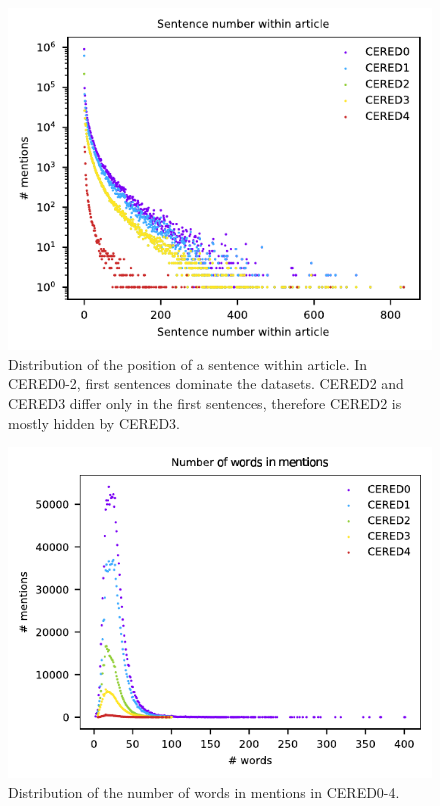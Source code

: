 \begin{figure}[h]\centering
\includegraphics[scale=1.2]{./img/firstsentence0-4_valid}
\caption{Distribution of the position of a sentence within article. In CERED0-2, first sentences dominate the datasets. CERED2 and CERED3 differ only in the first sentences, therefore CERED2 is mostly hidden by CERED3.}
\label{obr:firstsentences}
\end{figure}

\begin{figure}[h]\centering
\includegraphics[scale=1.2]{./img/Words0-4_valid}
\caption{Distribution of the number of words in mentions in CERED0-4.}
\label{obr:wordsinsentences}
\end{figure}


